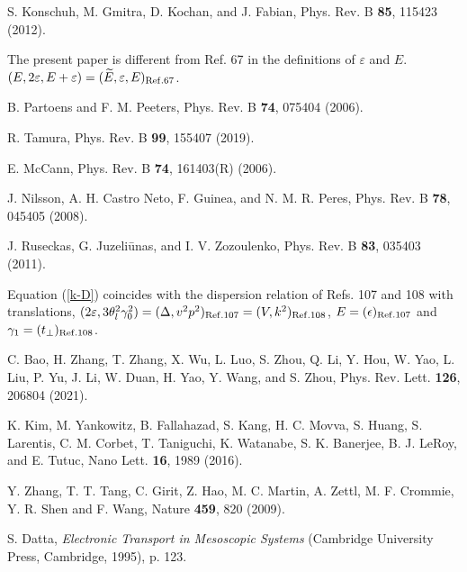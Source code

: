 \documentclass{jpsj3}
\begin{document}
\begin{thebibliography}{99}
S. Konschuh, M. Gmitra, D. Kochan, and J. Fabian, Phys. Rev. B {\bf 85}, 115423 (2012).


The present paper is different from Ref. 67
in the definitions of $\varepsilon$ and $E$.
$(E, 2\varepsilon, E+\varepsilon)=
(\widetilde{E}, \varepsilon, E)_{\rm Ref. 67}$.


B. Partoens and F. M. Peeters, Phys. Rev. B {\bf 74}, 075404 (2006).



R. Tamura, Phys. Rev. B {\bf 99}, 155407 (2019).


 E. McCann, Phys. Rev. B {\bf 74}, 161403(R) (2006).

 J. Nilsson,  A. H. Castro Neto, F. Guinea, and N. M. R. Peres, Phys. Rev. B {\bf 78}, 045405 (2008).

J. Ruseckas, G. Juzeli\={u}nas, and I. V. Zozoulenko, Phys. Rev. B {\bf 83}, 035403 (2011).

 Equation (\protect\ref{k-D}) coincides with the dispersion relation of Refs. 107 and 108 with translations, $(2\varepsilon, 3\theta_l^2\gamma_0^2)=(\Delta, v^2p^2)_{\rm Ref.107 }=(V, k^2)_{\rm Ref. 108}$, 
$E=(\epsilon)_{\rm Ref.107}$ and $\gamma_1=(t_{\bot})_{\rm Ref. 108}$.

C. Bao, H. Zhang, T. Zhang, X. Wu, L. Luo, S. Zhou, Q. Li, 
Y. Hou, W. Yao, L. Liu, P. Yu, J. Li, W. Duan, H. Yao, Y. Wang, and S. Zhou, 
Phys. Rev. Lett. {\bf 126}, 206804 (2021).


K. Kim, M. Yankowitz, B. Fallahazad, S. Kang, H. C. Movva, S. Huang, S. Larentis, C. M. Corbet, T. Taniguchi, K. Watanabe, S. K. Banerjee, B. J. LeRoy, and E. Tutuc, Nano Lett. {\bf 16}, 1989 (2016).

Y. Zhang, T. T. Tang, C. Girit, Z. Hao, M. C. Martin, A. Zettl, M. F. Crommie, Y. R. Shen and F. Wang, Nature {\bf 459}, 820 (2009).



S. Datta, {\it Electronic Transport in Mesoscopic Systems} (Cambridge University Press, Cambridge, 1995), p. 123.






\end{thebibliography}
\end{document}
